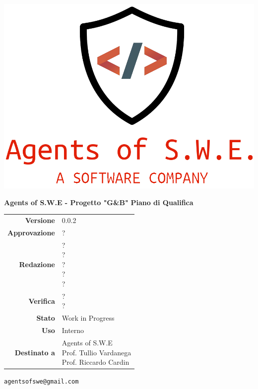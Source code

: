 


\begin{titlepage}
\thispagestyle{empty}

\begin{center}

\includegraphics[scale=0.3]{./images/logo.png} 

\large \textbf{Agents of S.W.E - Progetto "G\&B"}
\vfill
\Huge \textbf{Piano di Qualifica}
\vfill
\large
\renewcommand{\arraystretch}{1.3}
\begin{tabular}{r|l}
\textbf{Versione} & 0.0.2\\
\textbf{Approvazione} & ?\\
\textbf{Redazione} & \parbox[t]{5cm}{?\\?\\?\\?\\?}\\
\textbf{Verifica} & \parbox[t]{5cm}{?\\?}\\
\textbf{Stato} & Work in Progress\\
\textbf{Uso} & Interno\\
\textbf{Destinato a} & \parbox[t]{5cm}{Agents of S.W.E \\Prof. Tullio Vardanega\\Prof. Riccardo Cardin}
\end{tabular}
\vfill
\small
\texttt{agentsofswe@gmail.com}
\end{center}
\end{titlepage}

